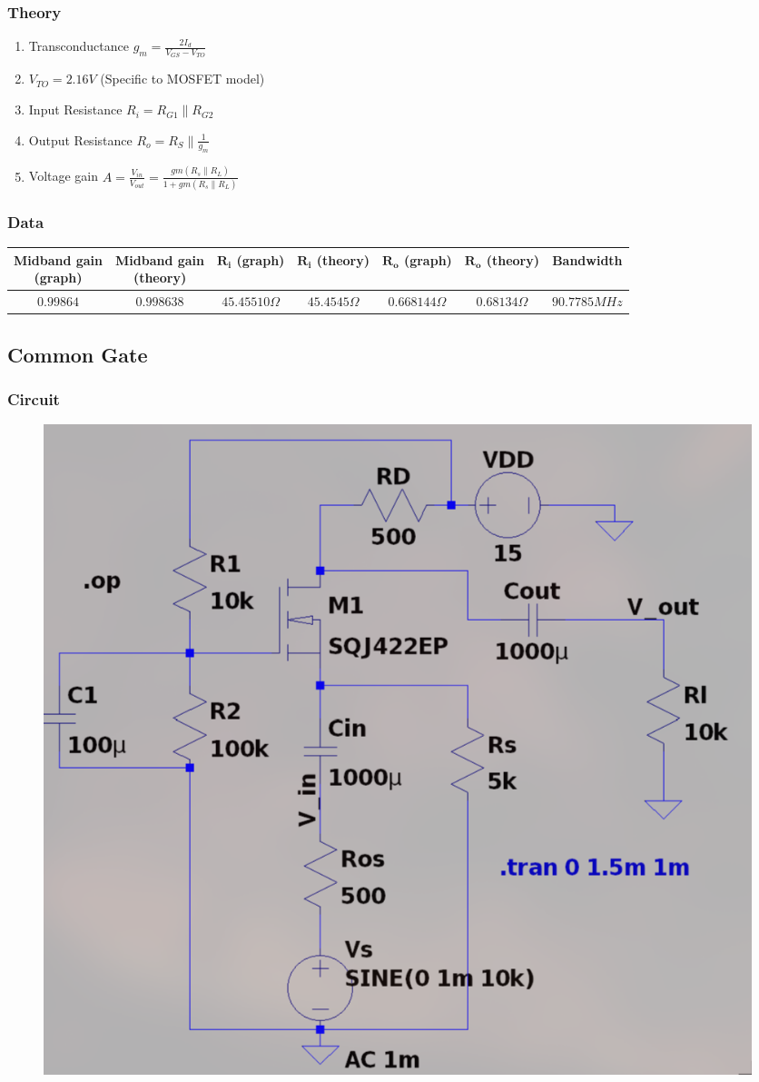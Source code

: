\documentclass{article}
\newcommand{\brak}[1]{\ensuremath{\left(#1\right)}}
\providecommand{\brak}[1]{\ensuremath{\left(#1\right)}}
\begin{document}
\subsubsection{Theory}
\begin{enumerate}
    \item Transconductance $g_m = \frac{2I_d}{V_{GS}-V_{TO}}$ 
    \item $V_{TO} = 2.16V$ (Specific to MOSFET model)
    \item Input Resistance $R_i = R_{G1} \parallel R_{G2}$  
    \item Output Resistance $R_o = R_S \parallel \frac{1}{g_m} $ 
    \item Voltage gain $A = \frac{V_{in}}{V_{out}} = \frac{gm \brak{R_s \parallel R_L}}{1+gm \brak{R_s \parallel R_L}}$ 
\end{enumerate} 
\subsubsection{Data}
\begin{tabular}{|c|c|c|c|c|c|c|}
\hline
\makecell{\textbf{Midband gain} \\ \textbf{(graph)}} & \makecell{\textbf{Midband gain} \\ \textbf{(theory)}} & \makecell{$\mathbf{R_i}$ \\ \textbf{(graph)}} & \makecell{{$\mathbf{R_i}$} \\ \textbf{(theory)}} & \makecell{{$\mathbf{R_o}$} \\ \textbf{(graph)}} & \makecell{{$\mathbf{R_o}$} \\ \textbf{(theory)}} & \textbf{Bandwidth} \\
\hline
$0.99864$ & $0.998638$ & $45.45510\Omega$ & $45.4545 \Omega$& $0.668144 \Omega$ & $0.68134\Omega$ & $90.7785 MHz$ \\
\hline
\end{tabular}
\pagebreak
\subsection{Common Gate}
\subsubsection{Circuit}
\begin{figure}[h!]
        \centering
        \includegraphics[width=0.7\linewidth]{figs/mosfet_cg_ckt.png}
    \end{figure}
\end{document}
